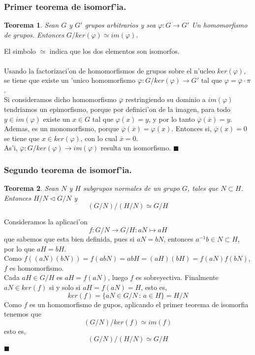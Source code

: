 \documentclass[a4paper,openright,12pt]{book}
\numberwithin{equation}{section} %
\newtheorem{teorema}{Teorema}[section] %
\newenvironment{proof}{\noindent{\it Demostracion:}}{\hfill$\blacksquare$} %
\begin{document}
\subsubsection{Primer teorema de isomorf'ia.}
\begin{teorema}
Sean $G$ y $G'$ grupos arbitrarios y sea $\varphi:G \rightarrow G'$ Un homomorfismo de grupos. Entonces $G/ker(\varphi)\simeq im(\varphi)$.
\end{teorema}
El simbolo $\simeq$ indica que los dos elementos son isomorfos.
\\
\\
\begin{proof}
Usando la factorizaci'on de homomorfismos de grupos sobre el n'ucleo $ker(\varphi)$, se tiene que existe un 'unico homomorfismo $\overline{\varphi}:G/ker(\varphi)\rightarrow G'$ tal que $\varphi=\overline{\varphi}\cdot\pi$.\\
Si consideramos dicho homomorfismo $\overline{\varphi}$ restringiendo su dominio a $im(\varphi)$ tendriamos un epimorfismo, porque por definici'on de la imagen, para todo $y \in im(\varphi)$ existe un $x \in G$ tal que $\varphi(x)=y$, y por lo tanto $\overline{\varphi}(\overline{x})=y$.\\
Ademas, es un monomorfismo, porque $\overline{\varphi}(\overline{x})=\varphi(x)$. Entonces si, $\overline{\varphi}(x)=0$ se tiene que $x \in ker(\varphi)$, con lo cual $\overline{x}=0$.\\
As'i, $\overline{\varphi}:G/ker(\varphi)\rightarrow im(\varphi)$ resulta un isomorfismo.
\end{proof}
\subsubsection{Segundo teorema de isomorf'ia.}
\begin{teorema}
Sean $N$ y $H$ subgrupos normales de un grupo $G$, tales que $N \subset H$. Entonces $H/N \triangleleft G/N$ y
\[
(G/N)/(H/N) \simeq G/H
\]
\end{teorema}
\begin{proof}
Consideramos la aplicaci'on 
\[
f:G/N \rightarrow G/H :aN \mapsto aH
\]
que sabemos que esta bien definida, pues si $aN = bN$, entonces $a^{-1}b \in N \subset H$, por lo que $aH=bH$.\\
Como $f((aN)(bN))=f(abN)=abH=(aH)(bH)=f(aN)f(bN)$, $f$ es homomorfismo.\\
Cada $aH \in G/H$ es $aH=f(aN)$, luego $f$ es sobreyectiva. Finalmente $aN \in ker(f)$ si y solo si $aH = f(aN)=H$, esto es,
\[
ker(f)=\{aN \in G/N\, : \, a \in H \}=H/N  
\]
Como $f$ es un homomorfismo de gupos, aplicando el primer teorema de isomorfia tenemos que
\[
(G/N)/ker(f) \simeq im(f)
\]
esto es,
\[
(G/N)/(H/N) \simeq G/H
\]
\end{proof}
\end{document}
